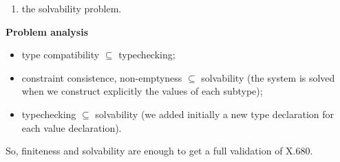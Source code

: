 \documentclass[12pt]{article}
\begin{document}
\begin{slide}
\begin{enumerate}
  \item the solvability problem.

\end{enumerate}

\pagebreak

\textbf{Problem analysis}

\begin{itemize}

  \item type compatibility $\subseteq$ typechecking;

  \item constraint consistence, non-emptyness $\subseteq$ solvability
        (the system is solved when we construct explicitly the values
        of each subtype);

  \item typechecking $\subseteq$ solvability (we added initially a new
        type declaration for each value declaration).

\end{itemize}

So, finiteness and solvability are enough to get a full validation of
X.680.

\end{slide}
\end{document}
